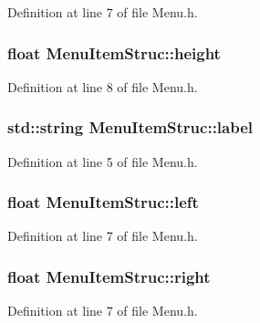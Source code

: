 Definition at line 7 of file Menu.\-h.

\hypertarget{struct_menu_item_struc_a1a2393a373a4f420e0ddfe8580f2b496}{
\subsubsection[{height}]{\setlength{\rightskip}{0pt plus 5cm}float Menu\-Item\-Struc\-::height}}\label{struct_menu_item_struc_a1a2393a373a4f420e0ddfe8580f2b496}


Definition at line 8 of file Menu.\-h.

\hypertarget{struct_menu_item_struc_ad9b5a715564f2510db2afc5047520d80}{
\subsubsection[{label}]{\setlength{\rightskip}{0pt plus 5cm}std\-::string Menu\-Item\-Struc\-::label}}\label{struct_menu_item_struc_ad9b5a715564f2510db2afc5047520d80}


Definition at line 5 of file Menu.\-h.

\hypertarget{struct_menu_item_struc_a4e5afdbd56bf59391a69dde566b56065}{
\subsubsection[{left}]{\setlength{\rightskip}{0pt plus 5cm}float Menu\-Item\-Struc\-::left}}\label{struct_menu_item_struc_a4e5afdbd56bf59391a69dde566b56065}


Definition at line 7 of file Menu.\-h.

\hypertarget{struct_menu_item_struc_a2228c8d93b8d540911f8ba280754a86f}{
\subsubsection[{right}]{\setlength{\rightskip}{0pt plus 5cm}float Menu\-Item\-Struc\-::right}}\label{struct_menu_item_struc_a2228c8d93b8d540911f8ba280754a86f}


Definition at line 7 of file Menu.\-h.

